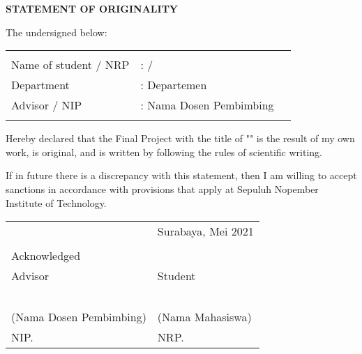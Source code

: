 \begin{center}
  \large
  \textbf{STATEMENT OF ORIGINALITY}
\end{center}

\thispagestyle{empty}

\vspace{2ex}


\noindent The undersigned below:

\noindent\begin{tabularx}{\textwidth}{X X l}
                        &                         \\
  Name of student / NRP & : \name{} / \nrp{}      \\
  Department            & : Departemen            \\
  Advisor / NIP         & : Nama Dosen Pembimbing \\
                        &                         \\
\end{tabularx}

Hereby declared that the Final Project with the title of "" is the result of my own work, is original, and is written by following the rules of scientific writing.

If in future there is a discrepancy with this statement, then I am willing to accept sanctions in accordance with provisions that apply at Sepuluh Nopember Institute of Technology.

\vspace{8ex}

\noindent\begin{tabularx}{\textwidth}{X l}
                          & Surabaya, Mei 2021 \\
                          &                    \\
  Acknowledged            &                    \\
  Advisor                 & Student            \\
                          &                    \\
                          &                    \\
                          &                    \\
                          &                    \\
                          &                    \\
  (Nama Dosen Pembimbing) & (Nama Mahasiswa)   \\
  NIP.                    & NRP.               \\
\end{tabularx}